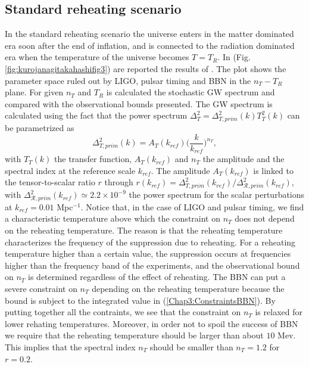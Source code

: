 \documentclass[11pt,a4paper,twoside]{book}
\begin{document}
\subsection*{Standard reheating scenario}
In the standard reheating scenario the universe enters in the matter dominated era soon after the end of inflation, and is connected to the radiation dominated era when the temperature of the universe becomes $ T=T_{R} $. In (Fig. \ref{fig:kurojanagitakahashifig3}) are reported the results of \cite{Chap3:BlueTiltedSpectrum}. The plot shows the parameter space ruled out by LIGO, pulsar timing and BBN in the $ n_{T}-T_{R} $ plane. For given $ n_{T} $ and $ T_{R} $ is calculated the stochastic GW spectrum and compared with the observational bounds presented. The GW spectrum is calculated using the fact that the power spectrum $\Delta_{T}^{2}=\Delta_{T,prim}^{2}(k)T_{T}^{2}(k)$ can be parametrized as
\begin{equation}
\Delta_{T,prim}^{2}(k)=A_{T}(k_{ref})\Big(\frac{k}{k_{ref}}\Big)^{n_{T}},
\end{equation} 
with $ T_{T}(k) $ the transfer function, $ A_{T}(k_{ref}) $ and $ n_{T} $ the amplitude and the spectral index at the reference scale $ k_{ref} $. The amplitude  $ A_{T}(k_{ref}) $  is linked to the tensor-to-scalar ratio $ r $ through $ r(k_{ref})=\Delta_{T,prim}^{2}(k_{ref})/\Delta_{\mathcal{R},prim}^{2}(k_{ref}) $, with $ \Delta_{\mathcal{R},prim}^{2}(k_{ref}) \simeq 2.2 \times 10^{-9} $ the power spectrum for the scalar perturbations at $ k_{ref}=0.01 $ Mpc$ ^{-1} $.
Notice that, in the case of LIGO and pulsar timing, we find a characteristic temperature above which the constraint on $ n_{T} $ does not depend on the reheating temperature. The reason is that the reheating temperature characterizes the frequency of the suppression due to reheating. For a reheating temperature higher than a certain value, the suppression occurs at  frequencies higher than the frequency band of the experiments, and the observational bound on $ n_{T} $ is determined regardless of the effect of reheating. The BBN can put a severe constraint on $ n_{T} $ depending on the reheating temperature because the bound is subject to the integrated value in (\ref{Chap3:ConstraintsBBN}). By putting together all the contraints, we see that the constraint on $ n_{T} $ is relaxed for lower rehating temperatures. Moreover, in order not to spoil the success of BBN we require that the reheating temperature should be larger than about $ 10 $ Mev. This implies that the spectral index $ n_{T} $ should be smaller than $ n_{T}=1.2 $ for $ r=0.2 $.
\end{document}

